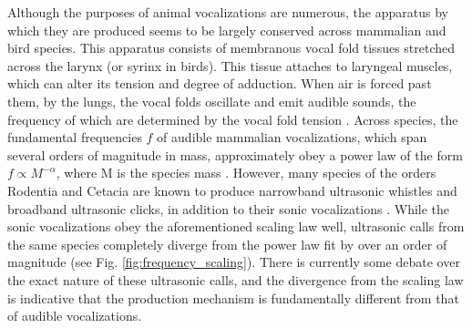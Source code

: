 \documentclass[superscriptaddress, twocolumn, prl]{revtex4}
\begin{document}
Although the purposes of animal vocalizations are numerous, the apparatus by which they are produced seems to be largely conserved across mammalian and bird species. This apparatus consists of membranous vocal fold tissues stretched across the larynx (or syrinx in birds). This tissue attaches to laryngeal muscles, which can alter its tension and degree of adduction. When air is forced past them, by the lungs, the vocal folds oscillate and emit audible sounds, the frequency of which are determined by the vocal fold tension \cite{Berke2010}. Across species, the fundamental frequencies $f$ of audible mammalian vocalizations, which span several orders of magnitude in mass, approximately obey a power law of the form $f\propto M^{-\alpha}$, where M is the species mass \cite{Fletcher2010}. However, many species of the orders Rodentia and Cetacia are known to produce narrowband ultrasonic whistles and broadband ultrasonic clicks, in addition to their sonic vocalizations \cite{white1998,berry1970natural,Fenton1998,Jones2006,bogdanowicz1994,Frankel2009,Whitehead2009,Rendell1999,Kastelein2000,Jefferson1993}. While the sonic vocalizations obey the aforementioned scaling law well, ultrasonic calls from the same species completely diverge from the power law fit by over an order of magnitude (see Fig. \ref{fig:frequency_scaling}). There is currently some debate over the exact nature of these ultrasonic calls, and the divergence from the scaling law is indicative that the production mechanism is fundamentally different from that of audible vocalizations.
\end{document}
